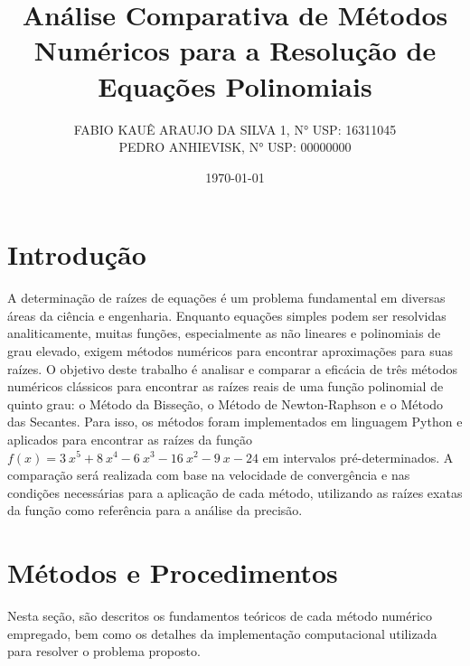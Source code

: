 \documentclass[12pt, a4paper]{article}
\title{Análise Comparativa de Métodos Numéricos para a Resolução de Equações Polinomiais}
\author{
    FABIO KAUÊ ARAUJO DA SILVA 1, N° USP: 16311045 \\
    PEDRO ANHIEVISK, N° USP: 00000000 \\
}
\date{\today}
\begin{document}
\maketitle

\section*{Introdução}
A determinação de raízes de equações é um problema fundamental em diversas áreas da ciência e engenharia. Enquanto equações simples podem ser resolvidas analiticamente, muitas funções, especialmente as não lineares e polinomiais de grau elevado, exigem métodos numéricos para encontrar aproximações para suas raízes. O objetivo deste trabalho é analisar e comparar a eficácia de três métodos numéricos clássicos para encontrar as raízes reais de uma função polinomial de quinto grau: o Método da Bisseção, o Método de Newton-Raphson e o Método das Secantes. Para isso, os métodos foram implementados em linguagem Python e aplicados para encontrar as raízes da função $f(x)=3~x^{5}+8~x^{4}-6~x^{3}-16~x^{2}-9~x-24$ em intervalos pré-determinados. A comparação será realizada com base na velocidade de convergência e nas condições necessárias para a aplicação de cada método, utilizando as raízes exatas da função como referência para a análise da precisão.

\section*{Métodos e Procedimentos}
Nesta seção, são descritos os fundamentos teóricos de cada método numérico empregado, bem como os detalhes da implementação computacional utilizada para resolver o problema proposto.
\end{document}
